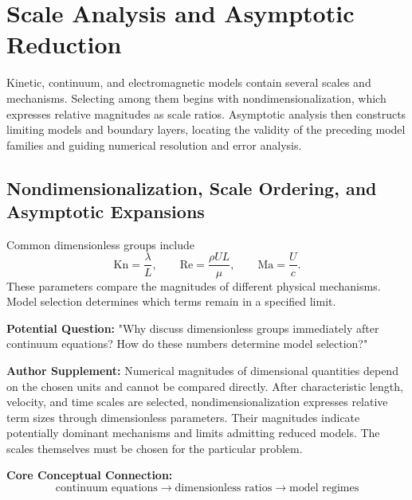 \chapter{Scale Analysis and Asymptotic Reduction}\label{ch:4}

\begin{chaptersummary}
Kinetic, continuum, and electromagnetic models contain several scales and mechanisms. Selecting among them begins with nondimensionalization, which expresses relative magnitudes as scale ratios. Asymptotic analysis then constructs limiting models and boundary layers, locating the validity of the preceding model families and guiding numerical resolution and error analysis.
\end{chaptersummary}

\section{Nondimensionalization, Scale Ordering, and Asymptotic Expansions}
Common dimensionless groups include
\[
\mathrm{Kn}=\frac{\lambda}{L},
\qquad
\mathrm{Re}=\frac{\rho UL}{\mu},
\qquad
\mathrm{Ma}=\frac{U}{c}.
\]
These parameters compare the magnitudes of different physical mechanisms. Model selection determines which terms remain in a specified limit.

\begin{authornote}
\textbf{Potential Question:}
"Why discuss dimensionless groups immediately after continuum equations? How do these numbers determine model selection?"

\textbf{Author Supplement:}
Numerical magnitudes of dimensional quantities depend on the chosen units and cannot be compared directly. After characteristic length, velocity, and time scales are selected, nondimensionalization expresses relative term sizes through dimensionless parameters. Their magnitudes indicate potentially dominant mechanisms and limits admitting reduced models. The scales themselves must be chosen for the particular problem.

\textbf{Core Conceptual Connection:}
\[
\text{continuum equations}
\longrightarrow
\text{dimensionless ratios}
\longrightarrow
\text{model regimes}
\]
\end{authornote}


